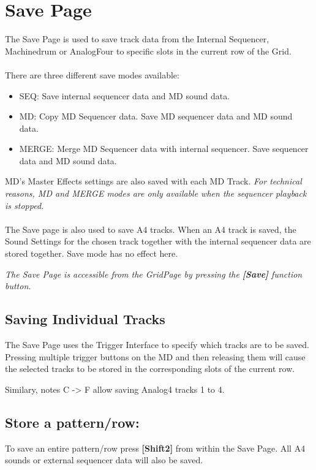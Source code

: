 \chapter{Save Page}

The Save Page is used to save track data from the Internal Sequencer, Machinedrum or AnalogFour to  specific slots in the current row of the Grid.\\
\\
There are three different save modes available:
\begin{itemize}
    \item SEQ: Save internal sequencer data and MD sound data.
    \item MD: Copy MD Sequencer data. Save MD sequencer data and MD sound data.
    \item MERGE: Merge MD Sequencer data with internal sequencer. Save sequencer data and MD sound data.
\end{itemize}
MD's Master Effects settings are also saved with each MD Track.
\textit{For technical reasons, MD and MERGE modes are only available when the sequencer playback is stopped.}
\\
\\The Save page is also used to save A4 tracks. When an A4 track is saved, the Sound Settings for the chosen track together with the internal sequencer data are stored together. Save mode has no effect here.



\textit{The Save Page is accessible from the GridPage by pressing the  \textbf{[Save]} function button.}


\section{Saving Individual Tracks}
The Save Page uses the Trigger Interface to specify which tracks are to be saved. Pressing multiple trigger buttons on the MD and then releasing them will cause the selected tracks to be stored in the corresponding slots of the current row.

Similary, notes C -> F allow saving Analog4 tracks 1 to 4.
\section{Store a pattern/row:}
To save an entire pattern/row press \textbf{[Shift2]} from within the Save Page. All A4 sounds or external sequencer data will also be saved.



